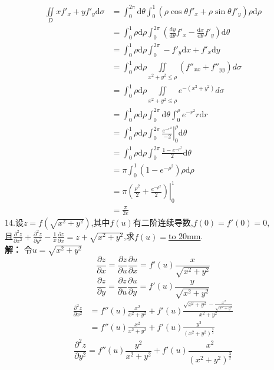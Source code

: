 \documentclass[a4paper]{article}
\begin{document}
\begin{align*}
    \iint\limits_{D} xf'_{x}+yf'_{y}\mathrm{d}\sigma &=\int_{0}^{2\pi} \mathrm{d}\theta \int_{0}^{1}(\rho\cos \theta f'_{x}+\rho\sin \theta f'_{y})\rho \mathrm{d}\rho\\
    &=\int_{0}^{1} \rho\mathrm{d}\rho \int_{0}^{2\pi} (\frac{\mathrm{d} y}{\mathrm{d} \theta}f'_{x}-\frac{\mathrm{d} x}{\mathrm{d} \theta}f'_{y})\mathrm{d}\theta\\
    &=\int_{0}^{1}\rho\mathrm{d}\rho\int_{0}^{2\pi}-f'_{y}\mathrm{d}x+f'_{x}\mathrm{d}y\\
    &=\int_{0}^{1}\rho\mathrm{d}\rho \iint\limits_{x^2+y^2\le \rho} (f''_{xx}+f''_{yy})d\sigma\\
    &=\int_{0}^{1}\rho\mathrm{d}\rho \iint\limits_{x^2+y^2\le \rho} e^{-(x^2+y^2)}d\sigma\\
    &=\int_{0}^{1}\rho \mathrm{d}\rho \int_{0}^{2\pi}\mathrm{d} \theta \int_{0}^{\rho} e^{-r^2} r\mathrm{d}r\\
    &=\int_{0}^{1}\rho \mathrm{d}\rho \int_{0}^{2\pi} \left. \frac{e^{-r^2}}{-2} \right|_{0}^{\rho} \mathrm{d} \theta\\
    &=\int_{0}^{1} \rho \mathrm{d}\rho \int_{0}^{2\pi}\frac{1-e^{-\rho^2}}{2}\mathrm{d}\theta \\
    &=\pi\int_{0}^{1} (1-e^{-\rho^2})\rho \mathrm{d}\rho\\
    &=\left.\pi(\frac{\rho^2}{2}+\frac{e^{-\rho^2}}{2})\right|_{0}^{1}\\
    &=\frac{\pi}{2e}
\end{align*}
14.设$z=f(\sqrt{x^2+y^2})$,其中$f(u)$有二阶连续导数,$f(0)=f'(0)=0$,\\
且$\frac{\partial^2 z}{\partial x^2}+\frac{\partial^2 z}{\partial y^2}-\frac{1}{x}\frac{\partial z}{\partial x}=z+\sqrt{x^2+y^2}$,求$f(u)=$\underline{\hbox to 20mm{}}.\\
\textbf{解：}
令$u=\sqrt{x^2+y^2}$
$$\frac{\partial z}{\partial x}=\frac{\partial z}{\partial u}\frac{\partial u}{\partial x} = f'(u)\frac{x}{\sqrt{x^2+y^2}}$$
$$\frac{\partial z}{\partial y}=\frac{\partial z}{\partial u}\frac{\partial u}{\partial y} = f'(u)\frac{y}{\sqrt{x^2+y^2}}$$
\begin{align*}
\frac{\partial^2 z}{\partial x^2}&=f''(u) \frac{x^2}{x^2+y^2}+f'(u)\frac{\sqrt{x^2+y^2} -\frac{x^2}{\sqrt{x^2+y^2}}}{x^2+y^2}\\
&=f''(u)\frac{x^2}{x^2+y^2}+f'(u)\frac{y^2}{(x^2+y^2)^{\frac{3}{2}}}
\end{align*}
$$\frac{\partial^2 z}{\partial y^2}=f''(u)\frac{y^2}{x^2+y^2}+f'(u)\frac{x^2}{(x^2+y^2)^{\frac{3}{2}}}$$
\end{document}
